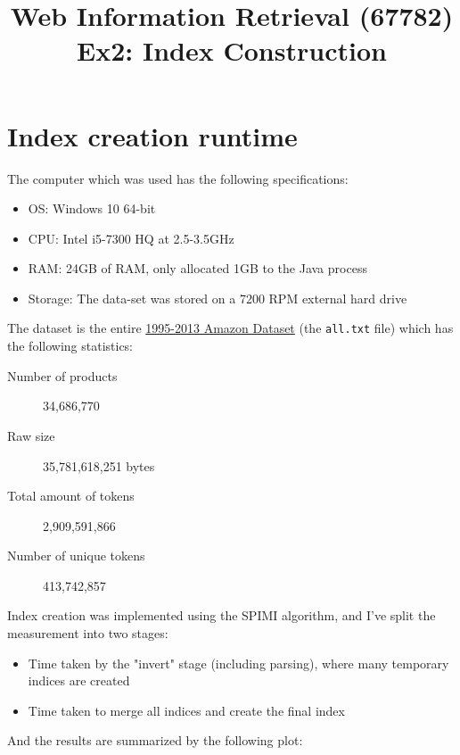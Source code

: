 \documentclass[11pt]{article}
\begin{document}
\title{Web Information Retrieval (67782)\\ Ex2: Index Construction}
\date{}

\maketitle
{}

\section{Index creation runtime}

The computer which was used has the following specifications:

\begin{itemize}
	\item OS: Windows 10 64-bit
	\item CPU: Intel i5-7300 HQ at 2.5-3.5GHz
	\item RAM: 24GB of RAM, only allocated 1GB to the Java process
	\item Storage: The data-set was stored on a 7200 RPM external hard drive
\end{itemize}

The dataset is the entire \href{https://snap.stanford.edu/data/web-Amazon.html}{1995-2013 Amazon Dataset} (the \texttt{all.txt} file) 
which has the following statistics:

\begin{description}
	\item[Number of products] 34,686,770
	\item[Raw size] 35,781,618,251 bytes
	\item[Total amount of tokens] 2,909,591,866
	\item[Number of unique tokens] 413,742,857
\end{description}

Index creation was implemented using the SPIMI algorithm, and I've split the measurement into two stages:

\begin{itemize}
	\item Time taken by the "invert" stage (including parsing), where many temporary indices are created
	\item Time taken to merge all indices and create the final index
\end{itemize}

And the results are summarized by the following plot:
\end{document}
